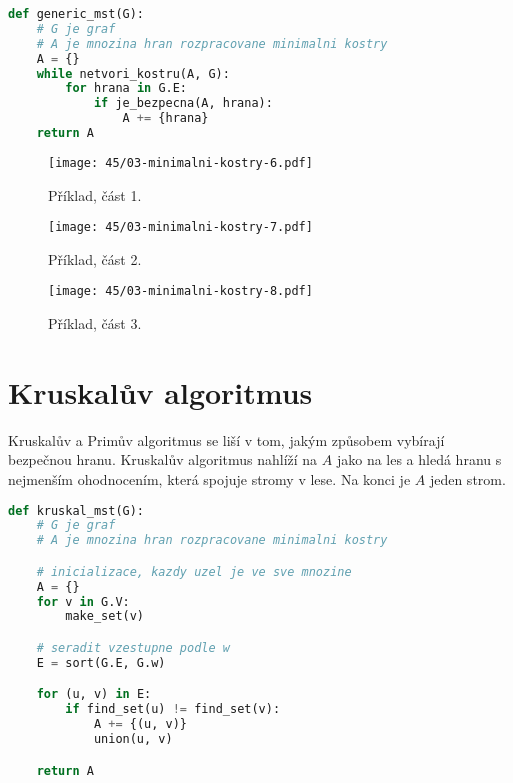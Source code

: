 \bigskip\noindent\begin{minipage}{\linewidth}
\begin{lstlisting}[language=Python, caption={Generický algoritmus. Před každou iterací algoritmu je množina $A$ podmnožinou nějaké minimální kostry. Hrana $(u,v) \in E$ je bezpečná pro $A$, pokud $A \cup \{(u, v)\}$ je podmnožinou nějaké minimální kostry.}]
def generic_mst(G):
    # G je graf
    # A je mnozina hran rozpracovane minimalni kostry
    A = {}
    while netvori_kostru(A, G):
        for hrana in G.E:
            if je_bezpecna(A, hrana):
                A += {hrana}
    return A
\end{lstlisting}
\end{minipage}

\begin{figure}[H]
    \centering
    \texttt{[image: 45/03-minimalni-kostry-6.pdf]}
    \caption{Příklad, část 1.}
\end{figure}

\begin{figure}[H]
    \centering
    \texttt{[image: 45/03-minimalni-kostry-7.pdf]}
    \caption{Příklad, část 2.}
\end{figure}

\begin{figure}[H]
    \centering
    \texttt{[image: 45/03-minimalni-kostry-8.pdf]}
    \caption{Příklad, část 3.}
\end{figure}


\section{Kruskalův algoritmus}

Kruskalův a Primův algoritmus se liší v tom, jakým způsobem vybírají bezpečnou hranu. Kruskalův algoritmus nahlíží na $A$ jako na les a hledá hranu s nejmenším ohodnocením, která spojuje stromy v lese. Na konci je $A$ jeden strom.

\bigskip\noindent\begin{minipage}{\linewidth}
\begin{lstlisting}[language=Python, caption={Kruskalův algoritmus. Funkce \texttt{make\_set(v)} vytvoří množinu obsahující $v$, \texttt{find\_set} vrátí reprezentanta množiny $v$, \texttt{union(u ,v)} sjednotí dvě množiny obsahující $u$ a $v$.}]
def kruskal_mst(G):
    # G je graf
    # A je mnozina hran rozpracovane minimalni kostry

    # inicializace, kazdy uzel je ve sve mnozine
    A = {}
    for v in G.V:
        make_set(v)

    # seradit vzestupne podle w
    E = sort(G.E, G.w)

    for (u, v) in E:
        if find_set(u) != find_set(v):
            A += {(u, v)}
            union(u, v)

    return A
\end{lstlisting}
\end{minipage}

